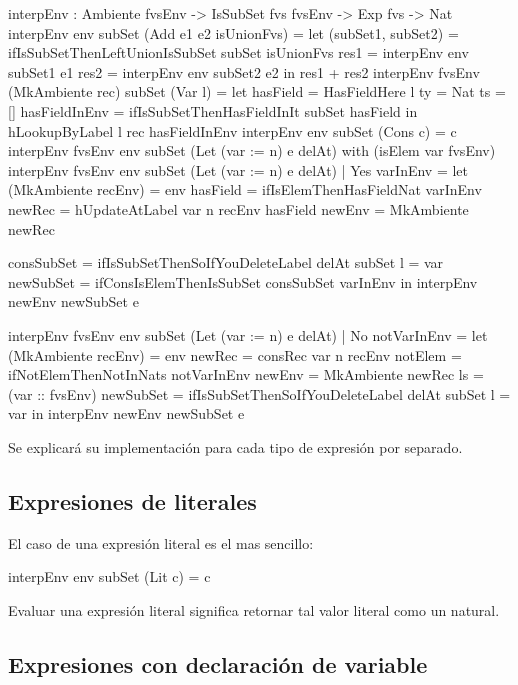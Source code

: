 \begin{code}
interpEnv : Ambiente fvsEnv -> IsSubSet fvs fvsEnv -> Exp fvs -> Nat
interpEnv env subSet (Add e1 e2 isUnionFvs) = 
  let (subSet1, subSet2) = 
        ifIsSubSetThenLeftUnionIsSubSet subSet isUnionFvs
      res1 = interpEnv env subSet1 e1
      res2 = interpEnv env subSet2 e2
  in res1 + res2
interpEnv {fvsEnv} (MkAmbiente rec) subSet (Var l) = 
  let hasField = HasFieldHere {l} {ty = Nat} {ts = []}
      hasFieldInEnv = ifIsSubSetThenHasFieldInIt  subSet hasField
  in hLookupByLabel l rec hasFieldInEnv
interpEnv env subSet (Cons c) = c
interpEnv {fvsEnv} env subSet (Let (var := n) e delAt) 
    with (isElem var fvsEnv)
  interpEnv {fvsEnv} env subSet (Let (var := n) e delAt) 
    | Yes varInEnv = 
    let
        (MkAmbiente recEnv) = env
        hasField = ifIsElemThenHasFieldNat varInEnv 
        newRec = hUpdateAtLabel var n recEnv hasField
        newEnv = MkAmbiente newRec
        
        consSubSet = 
          ifIsSubSetThenSoIfYouDeleteLabel delAt subSet {l = var}
        newSubSet = ifConsIsElemThenIsSubSet consSubSet varInEnv
    in interpEnv newEnv newSubSet e
    
  interpEnv {fvsEnv} env subSet (Let (var := n) e delAt) 
    | No notVarInEnv = 
    let (MkAmbiente recEnv) = env
        newRec = consRec var n recEnv
          {notElem = ifNotElemThenNotInNats notVarInEnv}
        newEnv = MkAmbiente newRec {ls = (var :: fvsEnv)}
        newSubSet = 
          ifIsSubSetThenSoIfYouDeleteLabel delAt subSet {l = var}
    in interpEnv newEnv newSubSet e
\end{code}

Se explicará su implementación para cada tipo de expresión por separado.

\subsection{Expresiones de literales}

El caso de una expresión literal es el mas sencillo:

\begin{code}
interpEnv env subSet (Lit c) = c
\end{code}

Evaluar una expresión literal significa retornar tal valor literal como un natural.

\subsection{Expresiones con declaración de variable}

